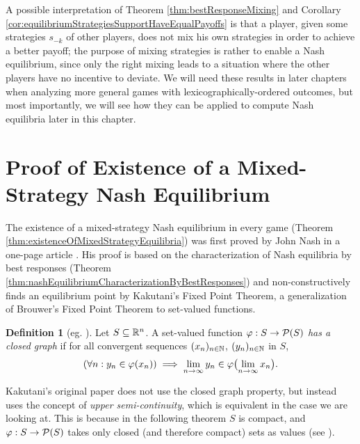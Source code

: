 \documentclass[a4paper]{scrreprt}
\let\phi\varphi
\theoremstyle{definition}
\newtheorem{defn}[thm]{Definition} %
\begin{document}
    A possible interpretation of Theorem \ref{thm:bestResponseMixing} and Corollary \ref{cor:equilibriumStrategiesSupportHaveEqualPayoffs} is that a player, given some strategies $s_{-k}$ of other players, does not mix his own strategies in order to achieve a better payoff; the purpose of mixing strategies is rather to enable a Nash equilibrium, since only the right mixing leads to a situation where the other players have no incentive to deviate.
    We will need these results in later chapters when analyzing more general games with lexicographically-ordered outcomes, but most importantly, we will see how they can be applied to compute Nash equilibria later in this chapter.
    
    \section{Proof of Existence of a Mixed-Strategy Nash Equilibrium}
    \label{sec:existenceOfMixedStrategyEquilibria}
    The existence of a mixed-strategy Nash equilibrium in every game (Theorem \ref{thm:existenceOfMixedStrategyEquilibria}) was first proved by John Nash in a one-page article \cite{bib:nashOnePageProofOfEquilibria}.
    His proof is based on the characterization of Nash equilibria by best responses (Theorem \ref{thm:nashEquilibriumCharacterizationByBestResponses}) and non-constructively finds an equilibrium point by Kakutani's Fixed Point Theorem, a generalization of Brouwer's Fixed Point Theorem to set-valued functions.
    
    \begin{defn}[eg. {\cite[p.30]{bib:fudenbergGameTheory}}]
        Let $S \subseteq \mathbb{R}^n$. A set-valued function $\phi: S \to \Pot(S)$ \emph{has a closed graph} if for all convergent sequences $(x_n)_{n \in \mathbb{N}}$, $(y_n)_{n \in \mathbb{N}}$ in $S$,
        \begin{gather*} 
            (\forall n: y_n \in \phi(x_n)) \implies \liminfty{n} y_n \in \phi\bigpars{\liminfty{n} x_n}.
        \end{gather*}
    \end{defn}

    Kakutani's original paper does not use the closed graph property, but instead uses the concept of \emph{upper semi-continuity}, which is equivalent in the case we are looking at. This is because in the following theorem $S$ is compact, and $\phi: S \to \Pot(S)$ takes only closed (and therefore compact) sets as values (see \cites{bib:kakutaniFixedPointTheorem}[Proposition 11.9, (a)-(b)]{bib:borderFixedPointTheorems}).
\end{document}

